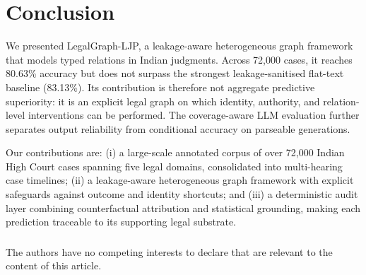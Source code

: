 \documentclass[runningheads]{llncs}
\newcommand{\method}{LegalGraph-LJP}
\begin{document}
\section{Conclusion}
\label{sec:conclusion}

We presented \method{}, a leakage-aware heterogeneous graph framework that models typed relations in Indian judgments. Across 72{,}000 cases, it reaches 80.63\% accuracy but does not surpass the strongest leakage-sanitised flat-text baseline (83.13\%). Its contribution is therefore not aggregate predictive superiority: it is an explicit legal graph on which identity, authority, and relation-level interventions can be performed. The coverage-aware LLM evaluation further separates output reliability from conditional accuracy on parseable generations.

Our contributions are: (i) a large-scale annotated corpus of over 72{,}000 Indian High Court cases spanning five legal domains, consolidated into multi-hearing case timelines; (ii) a leakage-aware heterogeneous graph framework with explicit safeguards against outcome and identity shortcuts; and (iii) a deterministic audit layer combining counterfactual attribution and statistical grounding, making each prediction traceable to its supporting legal substrate.

\begin{credits}
\subsubsection{\discintname}
The authors have no competing interests to declare that are relevant to the content of this article.
\end{credits}



\end{document}

